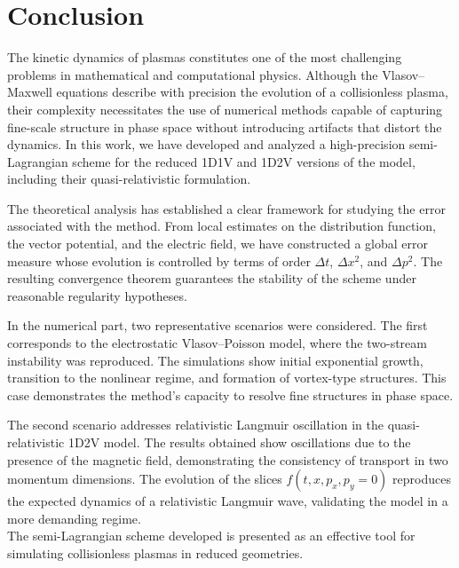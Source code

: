 \documentclass[11pt,a4paper,twoside,pdf]{article}
\numberwithin{equation}{section}
\begin{document}


\newpage

\section{Conclusion}

The kinetic dynamics of plasmas constitutes one of the most challenging problems in mathematical and computational physics. Although the Vlasov--Maxwell equations describe with precision the evolution of a collisionless plasma, their complexity necessitates the use of numerical methods capable of capturing fine-scale structure in phase space without introducing artifacts that distort the dynamics. In this work, we have developed and analyzed a high-precision semi-Lagrangian scheme for the reduced 1D1V and 1D2V versions of the model, including their quasi-relativistic formulation.

The theoretical analysis has established a clear framework for studying the error associated with the method. From local estimates on the distribution function, the vector potential, and the electric field, we have constructed a global error measure whose evolution is controlled by terms of order $\Delta t$, $\Delta x^2$, and $\Delta p^2$. The resulting convergence theorem guarantees the stability of the scheme under reasonable regularity hypotheses.

In the numerical part, two representative scenarios were considered. The first corresponds to the electrostatic Vlasov--Poisson model, where the two-stream instability was reproduced. The simulations show initial exponential growth, transition to the nonlinear regime, and formation of vortex-type structures. This case demonstrates the method's capacity to resolve fine structures in phase space.

The second scenario addresses relativistic Langmuir oscillation in the quasi-relativistic 1D2V model. The results obtained show oscillations due to the presence of the magnetic field, demonstrating the consistency of transport in two momentum dimensions. The evolution of the slices $f(t,x,p_x,p_y=0)$ reproduces the expected dynamics of a relativistic Langmuir wave, validating the model in a more demanding regime.\\

The semi-Lagrangian scheme developed is presented as an effective tool for simulating collisionless plasmas in reduced geometries.





\newpage





\end{document}
